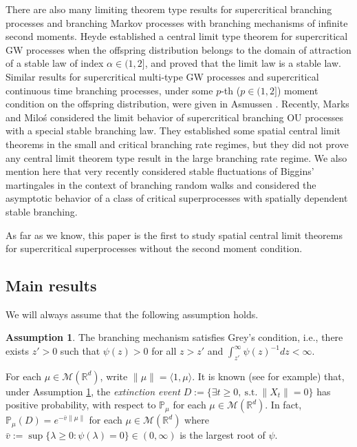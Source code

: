 \documentclass[12pt,a4paper]{amsart}
\theoremstyle{plain}
\theoremstyle{definition}
\newtheorem{asp}{Assumption}
\numberwithin{equation}{section}
\begin{document}
There are also many limiting theorem type results for supercritical branching processes and branching Markov processes with branching mechanisms of infinite second moments.
Heyde \cite{Heyde1971Some} established a central limit type  theorem for supercritical GW processes when the offspring distribution belongs to the domain of attraction of a stable law of index $\alpha\in (1, 2]$, and proved that the limit law is  a stable law. 
Similar results  for supercritical multi-type GW processes and supercritical  continuous time branching processes, 
under some $p$-th ($p\in(1,2]$) moment condition on the offspring distribution, were given in Asmussen \cite{Asmussen76Convergence}.
Recently, Marks and Milo\'s \cite{MarksMilos2018CLT} considered the limit behavior of supercritical branching OU processes with a special stable branching law.
They established some spatial central limit theorems in the small and critical branching rate regimes, but they did not prove any central limit theorem type result in the large branching rate regime.
We also mention here that very recently \cite{IksanovKoleskoMeiners2018Stable-like} considered stable fluctuations of Biggins' martingales in the context of branching random walks and \cite{RenSongSun2018Limit} considered the asymptotic behavior of a class of critical superprocesses with spatially dependent stable branching.

As far as we know, this paper is the first to study spatial central limit theorems for supercritical superprocesses without the second moment condition.

\subsection{Main results}
\label{sec:I:R}
We will always assume that the following assumption holds.
\begin{asp}
  \label{asp: Greys condition}
  The branching mechanism satisfies Grey's condition, i.e., there exists $z' > 0$ such that $\psi(z) > 0$ for all $z>z'$ and  $\int_{z'}^\infty \psi(z)^{-1}dz < \infty$.
\end{asp}
For each $\mu \in \mathcal M(\mathbb R^d)$, write $\|\mu\| = \langle 1, \mu\rangle$.
It is known (see \cite[Theorems 12.5 \& 12.7]{Kyprianou2014Fluctuations} for example) that, under Assumption \ref{asp: Greys condition}, the \emph{extinction event} $D :=\{\exists t\geq 0,~\text{s.t.}~ \|X_t\| =0 \}$ has positive probability, with respect to $\mathbb P_\mu$ for each  $\mu \in \mathcal M(\mathbb R^d)$.
In fact, $ \mathbb{P}_{\mu} (D) = e^{-\bar v \|\mu\|}$ for each $\mu\in \mathcal M(\mathbb R^d)$ where $ \bar v := \sup\{\lambda \geq 0: \psi(\lambda) = 0\} \in (0,\infty) $ is the largest root of $\psi$.
\end{document}
